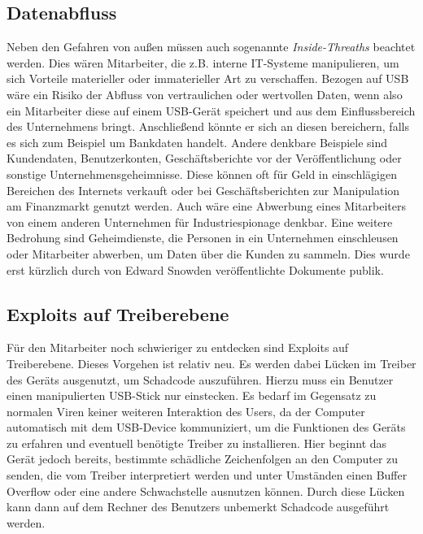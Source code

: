 \subsection{Datenabfluss}
Neben den Gefahren von außen müssen auch sogenannte \textit{Inside-Threaths} beachtet werden. Dies wären Mitarbeiter, die z.B. interne IT-Systeme manipulieren, um sich Vorteile materieller oder immaterieller Art zu verschaffen. Bezogen auf USB wäre ein Risiko der Abfluss von vertraulichen oder wertvollen Daten, wenn also ein Mitarbeiter diese auf einem USB-Gerät speichert und aus dem Einflussbereich des Unternehmens bringt. Anschließend könnte er sich an diesen bereichern, falls es sich zum Beispiel um Bankdaten handelt. Andere denkbare Beispiele sind Kundendaten, Benutzerkonten, Geschäftsberichte vor der Veröffentlichung oder sonstige Unternehmensgeheimnisse. Diese können oft für Geld in einschlägigen Bereichen des Internets verkauft oder bei Geschäftsberichten zur Manipulation am Finanzmarkt genutzt werden. Auch wäre eine Abwerbung eines Mitarbeiters von einem anderen Unternehmen für Industriespionage denkbar.
Eine weitere Bedrohung sind Geheimdienste, die Personen in ein Unternehmen einschleusen oder Mitarbeiter abwerben, um Daten über die Kunden zu sammeln. Dies wurde erst kürzlich durch von Edward Snowden veröffentlichte Dokumente publik.\cite{Snowden2}

\subsection{Exploits auf Treiberebene}
Für den Mitarbeiter noch schwieriger zu entdecken sind Exploits auf Treiberebene. Dieses Vorgehen ist relativ neu. Es werden dabei Lücken im Treiber des Geräts ausgenutzt, um Schadcode auszuführen. Hierzu muss ein Benutzer einen manipulierten USB-Stick nur einstecken. Es bedarf im Gegensatz zu normalen Viren keiner weiteren Interaktion des Users, da der Computer automatisch mit dem USB-Device kommuniziert, um die Funktionen des Geräts zu erfahren und eventuell benötigte Treiber zu installieren. Hier beginnt das Gerät jedoch bereits, bestimmte schädliche Zeichenfolgen an den  Computer zu senden, die vom Treiber interpretiert werden und unter Umständen einen Buffer Overflow  oder eine andere Schwachstelle ausnutzen können\cite{BadUSB}. Durch diese Lücken kann dann auf dem Rechner des Benutzers unbemerkt Schadcode ausgeführt werden.


